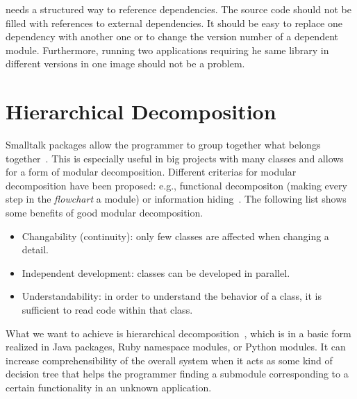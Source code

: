 \msname needs a structured way to reference dependencies. The source code should not be filled with references to external dependencies. It should be easy to replace one dependency with another one or to change the version number of a dependent module. Furthermore, running two applications requiring he same library in different versions in one image should not be a problem.

\section{Hierarchical Decomposition}
\label{sec:problem_hier_decomp}
Smalltalk packages allow the programmer to group together what belongs together~\cite{Eckel:2002:TJ:579108}. This is especially useful in big projects with many classes and allows for a form of modular decomposition. Different criterias for modular decomposition have been proposed: e.g., functional decompositon (making every step in the \emph{flowchart} a module) or information hiding~\cite{Parnas:1972:CUD:361598.361623, Parnas:1984:MSC:800054.801999}. The following list shows some benefits of good modular decomposition.

\begin{itemize}
	\item Changability (continuity): only few classes are affected when changing a detail.
	\item Independent development: classes can be developed in parallel.
	\item Understandability: in order to understand the behavior of a class, it is sufficient to read code within that class.
\end{itemize}

What we want to achieve is hierarchical decomposition~\cite{Blume:1999:HM:325478.325518}, which is in a basic form realized in Java packages, Ruby namespace modules, or Python modules. It can increase comprehensibility of the overall system when it acts as some kind of decision tree that helps the programmer finding a submodule corresponding to a certain functionality in an unknown application. 


